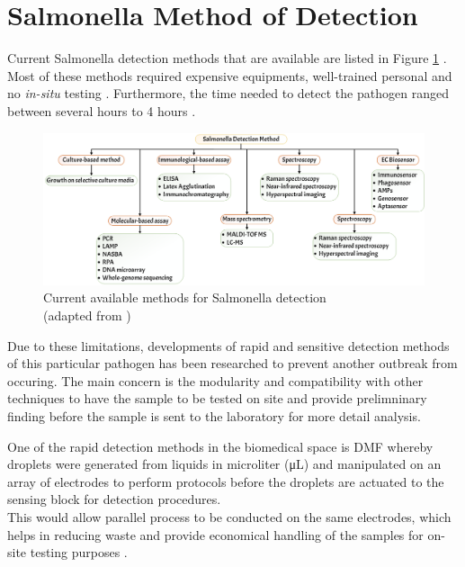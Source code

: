 \section{Salmonella Method of Detection}
Current Salmonella detection methods that are available are listed in Figure \ref{CurrSalmDetecMetho} \cite{awangAdvancementSalmonellaDetection2021}. Most of these methods required expensive equipments, well-trained personal and no \textit{in-situ} testing \cite{shenBiosensorsRapidDetection2021,wangOverviewRapidDetection2021}. Furthermore, the time needed to detect the pathogen ranged between several hours to 4 hours  \cite{awangAdvancementSalmonellaDetection2021}.\\
\begin{figure}[h!]
    \centering
    \includegraphics[width=\linewidth]{Figures/Awang_2021_Salmonella_Detection.png}
    \caption{Current available methods for Salmonella detection \\ (adapted from \cite{awangAdvancementSalmonellaDetection2021})}
    \label{CurrSalmDetecMetho}
\end{figure}

Due to these limitations, developments of rapid and sensitive detection methods of this particular pathogen has been researched to prevent another outbreak from occuring. The main concern is the modularity and compatibility with other techniques to have the sample to be tested on site and provide prelimninary finding before the sample is sent to the laboratory for more detail analysis.\newpage

One of the rapid detection methods in the biomedical space is DMF whereby droplets were generated from liquids in microliter (μL) and manipulated on an array of electrodes to perform protocols before the droplets are actuated to the sensing block for detection procedures.\\

This would allow parallel process to be conducted on the same electrodes, which helps in reducing waste and provide economical handling of the samples for on-site testing purposes \cite{agarwalDigitalMicrofluidicsTechniques2012}.\\